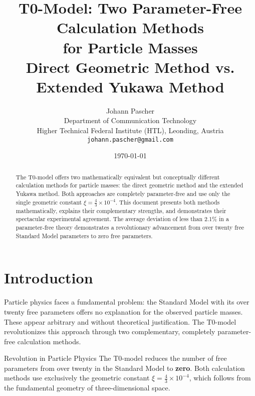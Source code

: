 \documentclass[12pt,a4paper]{article}
\newcommand{\xipar}{\xi}
\begin{document}
	
	\title{T0-Model: Two Parameter-Free Calculation Methods \\
		for Particle Masses \\
		\large Direct Geometric Method vs. Extended Yukawa Method}
	\author{Johann Pascher\\
		Department of Communication Technology\\
		Higher Technical Federal Institute (HTL), Leonding, Austria\\
		\texttt{johann.pascher@gmail.com}}
	\date{\today}
	
	\maketitle
	
	\begin{abstract}
		The T0-model offers two mathematically equivalent but conceptually different calculation methods for particle masses: the direct geometric method and the extended Yukawa method. Both approaches are completely parameter-free and use only the single geometric constant $\xipar = \frac{4}{3} \times 10^{-4}$. This document presents both methods mathematically, explains their complementary strengths, and demonstrates their spectacular experimental agreement. The average deviation of less than 2.1\% in a parameter-free theory demonstrates a revolutionary advancement from over twenty free Standard Model parameters to zero free parameters.
	\end{abstract}
	
	\tableofcontents
	\newpage
	
	\section{Introduction}
	\label{sec:introduction}
	
	Particle physics faces a fundamental problem: the Standard Model with its over twenty free parameters offers no explanation for the observed particle masses. These appear arbitrary and without theoretical justification. The T0-model revolutionizes this approach through two complementary, completely parameter-free calculation methods.
	
	\begin{important}{Revolution in Particle Physics}{}
		The T0-model reduces the number of free parameters from over twenty in the Standard Model to \textbf{zero}. Both calculation methods use exclusively the geometric constant $\xipar = \frac{4}{3} \times 10^{-4}$, which follows from the fundamental geometry of three-dimensional space.
	\end{important}
	
\end{document}
